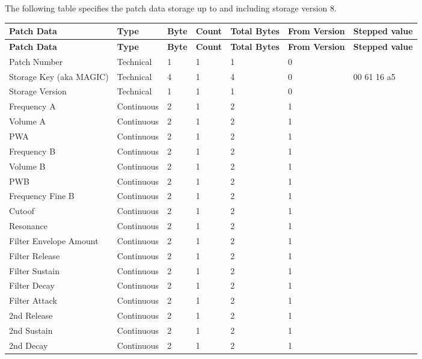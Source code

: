The following table specifies the patch data storage up to and including storage version 8. 

\footnotesize
\renewcommand{\arraystretch}{1.3}

\begin{longtable}[l]{p{5cm}|p{2cm}|p{1.5cm}|p{1.5cm}|p{2cm}|p{2.2cm}|p{5cm}} 
\textbf{Patch Data} & \textbf{Type} & \textbf{Byte} & \textbf{Count} & \textbf{Total Bytes} & \textbf{From Version} & \textbf{Stepped value} \\ \hline
\endfirsthead
\textbf{Patch Data} & \textbf{Type} & \textbf{Byte} & \textbf{Count} & \textbf{Total Bytes} & \textbf{From Version} & \textbf{Stepped value} \\ \hline
\endhead 

Patch Number & Technical & 1 & 1 & 1 & 0 &  \\ \hline
Storage Key (aka MAGIC) & Technical & 4 & 1 & 4 & 0 & 00 61 16 a5 \\ \hline
Storage Version & Technical & 1 & 1 & 1 & 0 &  \\ \hline
Frequency A & Continuous & 2 & 1 & 2 & 1 &  \\ \hline
Volume A & Continuous & 2 & 1 & 2 & 1 &  \\ \hline
PWA & Continuous & 2 & 1 & 2 & 1 &  \\ \hline
Frequency B & Continuous & 2 & 1 & 2 & 1 &  \\ \hline
Volume B & Continuous & 2 & 1 & 2 & 1 &  \\ \hline
PWB & Continuous & 2 & 1 & 2 & 1 &  \\ \hline
Frequency Fine B & Continuous & 2 & 1 & 2 & 1 &  \\ \hline
Cutoof & Continuous & 2 & 1 & 2 & 1 &  \\ \hline
Resonance & Continuous & 2 & 1 & 2 & 1 &  \\ \hline
Filter Envelope Amount & Continuous & 2 & 1 & 2 & 1 &  \\ \hline
Filter Release & Continuous & 2 & 1 & 2 & 1 &  \\ \hline
Filter Sustain & Continuous & 2 & 1 & 2 & 1 &  \\ \hline
Filter Decay & Continuous & 2 & 1 & 2 & 1 &  \\ \hline
Filter Attack & Continuous & 2 & 1 & 2 & 1 &  \\ \hline
2nd Release & Continuous & 2 & 1 & 2 & 1 &  \\ \hline
2nd Sustain & Continuous & 2 & 1 & 2 & 1 &  \\ \hline
2nd Decay & Continuous & 2 & 1 & 2 & 1 &  \\ \hline

\end{longtable}

